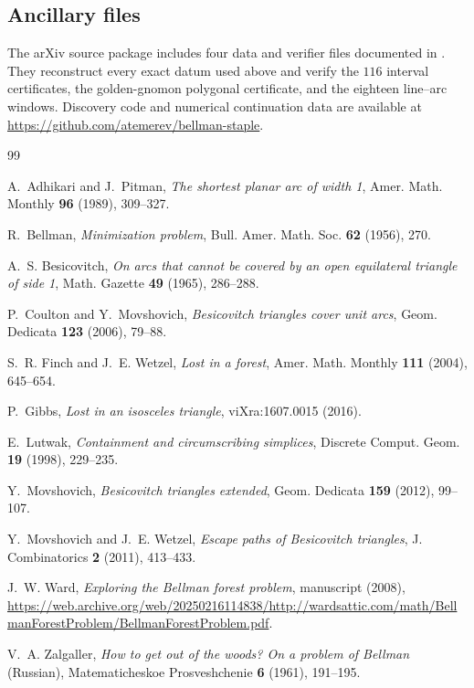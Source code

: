\documentclass[11pt]{amsart}
\theoremstyle{remark}
\begin{document}
\subsection*{Ancillary files}
The arXiv source package includes four data and verifier files documented in
.  They reconstruct every exact datum used above and
verify the $116$ interval certificates, the golden-gnomon polygonal
certificate, and the eighteen line--arc windows.  Discovery code and
numerical continuation data are available at
\url{https://github.com/atemerev/bellman-staple}.

\enlargethispage{6\baselineskip}
\begin{thebibliography}{99}

A.~Adhikari and J.~Pitman,
\emph{The shortest planar arc of width 1},
Amer. Math. Monthly \textbf{96} (1989), 309--327.

R.~Bellman,
\emph{Minimization problem},
Bull. Amer. Math. Soc. \textbf{62} (1956), 270.

A.~S. Besicovitch,
\emph{On arcs that cannot be covered by an open equilateral triangle of side 1},
Math. Gazette \textbf{49} (1965), 286--288.

P.~Coulton and Y.~Movshovich,
\emph{Besicovitch triangles cover unit arcs},
Geom. Dedicata \textbf{123} (2006), 79--88.

S.~R. Finch and J.~E. Wetzel,
\emph{Lost in a forest},
Amer. Math. Monthly \textbf{111} (2004), 645--654.

P.~Gibbs,
\emph{Lost in an isosceles triangle},
viXra:1607.0015 (2016).

E.~Lutwak,
\emph{Containment and circumscribing simplices},
Discrete Comput. Geom. \textbf{19} (1998), 229--235.

Y.~Movshovich,
\emph{Besicovitch triangles extended},
Geom. Dedicata \textbf{159} (2012), 99--107.

Y.~Movshovich and J.~E. Wetzel,
\emph{Escape paths of Besicovitch triangles},
J. Combinatorics \textbf{2} (2011), 413--433.

J.~W. Ward,
\emph{Exploring the Bellman forest problem}, manuscript (2008),
\url{https://web.archive.org/web/20250216114838/http://wardsattic.com/math/BellmanForestProblem/BellmanForestProblem.pdf}.

V.~A. Zalgaller,
\emph{How to get out of the woods? On a problem of Bellman} (Russian),
Matematicheskoe Prosveshchenie \textbf{6} (1961), 191--195.

\end{thebibliography}
\end{document}
